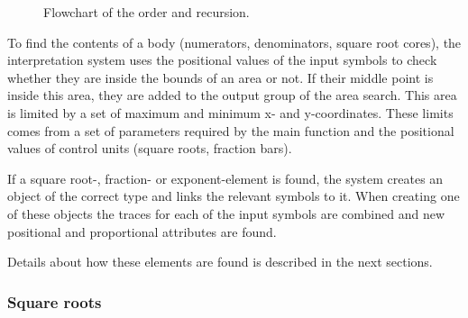 \begin{figure}[H]
\centering
    \caption{Flowchart of the order and recursion.}

\label{fig:interpretation_flowchart}
\end{figure}

To find the contents of a body (numerators, denominators, square root cores), the interpretation system uses the positional values of the input symbols to check whether they are inside the bounds of an area or not. If their middle point is inside this area, they are added to the output group of the area search. This area is limited by a set of maximum and minimum x- and y-coordinates. These limits comes from a set of parameters required by the main function and the positional values of control units (square roots, fraction bars).

If a square root-, fraction- or exponent-element is found, the system creates an object of the correct type and links the relevant symbols to it. When creating one of these objects the traces for each of the input symbols are combined and new positional and proportional attributes are found.

Details about how these elements are found is described in the next sections.

\subsubsection{Square roots}
\label{interpretation-square-roots}

